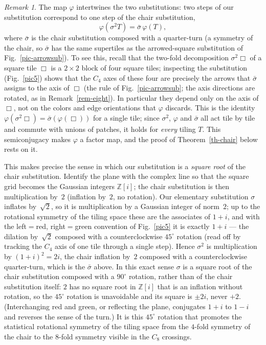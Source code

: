 \documentclass[11pt]{article}
\theoremstyle{remark}
\newtheorem{remark}{Remark}
\begin{document}
\begin{remark}\label{rem-commute}
The map $\varphi$ intertwines the two substitutions: two steps of our
substitution correspond to one step of the chair substitution,
$$
\varphi(\sigma^2 T)=\bar\sigma\,\varphi(T),
$$
where $\bar\sigma$ is the chair substitution composed with a quarter-turn (a
symmetry of the chair, so $\bar\sigma$ has the same supertiles as the
arrowed-square substitution of Fig.~\ref{pic-arrowsub}). To see this, recall
that the two-fold decomposition $\sigma^2\Box$ of a square tile $\Box$ is a
$2\times2$ block of four square tiles; inspecting the substitution
(Fig.~\ref{pic5}) shows that the $C_4$ axes of these four are precisely the
arrows that $\bar\sigma$ assigns to the axis of $\Box$ (the rule of
Fig.~\ref{pic-arrowsub}; the axis directions are rotated, as in
Remark~\ref{rem-eight}). In particular they depend only on the axis of $\Box$,
not on the colors and edge orientations that $\varphi$ discards. This is the
identity $\varphi(\sigma^2\Box)=\bar\sigma(\varphi(\Box))$ for a single tile;
since $\sigma^2$, $\varphi$ and $\bar\sigma$ all act tile by tile and commute
with unions of patches, it holds for \emph{every} tiling $T$. This semiconjugacy
makes $\varphi$ a factor map, and the proof of Theorem~\ref{th-chair} below
rests on it.

This makes precise the sense in which our substitution is a \emph{square root}
of the chair substitution. Identify the plane with the complex line so that the
square grid becomes the Gaussian integers $\mathbb Z[i]$; the chair substitution
is then multiplication by~$2$ (inflation by~$2$, no rotation). Our elementary
substitution $\sigma$ inflates by~$\sqrt2$, so it is multiplication by a Gaussian
integer of norm~$2$; up to the rotational symmetry of the tiling space these are
the associates of $1+i$, and with the left${}={}$red, right${}={}$green
convention of Fig.~\ref{pic5} it is exactly $1+i$ --- the dilation by~$\sqrt2$
composed with a counterclockwise $45^\circ$ rotation (read off by tracking the
$C_4$ axis of one tile through a single step). Hence $\sigma^2$ is multiplication
by $(1+i)^2=2i$, the chair inflation by~$2$ composed with a counterclockwise
quarter-turn, which is the $\bar\sigma$ above. In this exact sense $\sigma$ is a
square root of the chair substitution composed with a $90^\circ$ rotation,
rather than of the chair substitution itself: $2$ has no square root in $\mathbb
Z[i]$ that is an inflation without rotation, so the $45^\circ$ rotation is
unavoidable and its square is $\pm2i$, never $+2$. (Interchanging red and green,
or reflecting the plane, conjugates $1+i$ to $1-i$ and reverses the sense of the
turn.) It is this $45^\circ$ rotation that promotes the statistical rotational
symmetry of the tiling space from the $4$-fold symmetry of the chair to the
$8$-fold symmetry visible in the $C_8$ crossings.
\end{remark}
\end{document}
